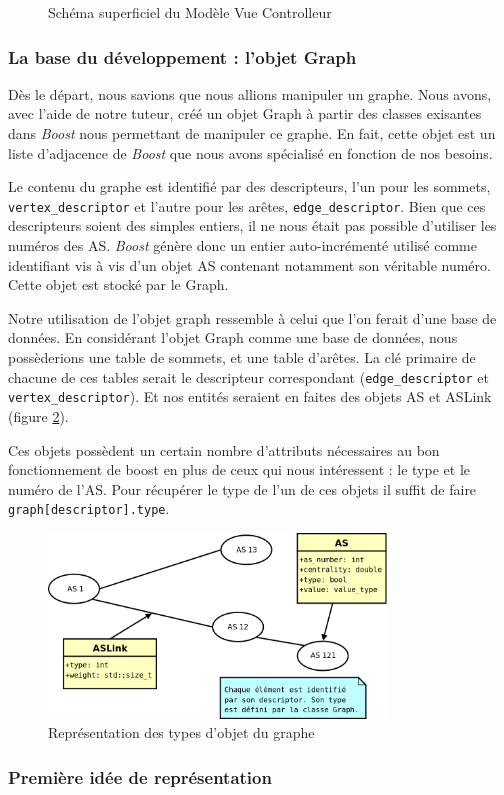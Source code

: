 \begin{figure}[!ht]
\begin{center}
\caption{Schéma superficiel du Modèle Vue Controlleur}
\label{mvc}
\end{center}
\end{figure}

\subsubsection{La base du développement : l'objet Graph}

Dès le départ, nous savions que nous allions manipuler un graphe. Nous avons, avec l'aide de notre tuteur, créé un objet Graph à partir des classes exisantes dans \textit{Boost} nous permettant de manipuler ce graphe. En fait, cette objet est un liste d'adjacence de \textit{Boost} que nous avons spécialisé en fonction de nos besoins.

Le contenu du graphe est identifié par des descripteurs, l'un pour les sommets, \verb|vertex_descriptor| et l'autre pour les arêtes, \verb|edge_descriptor|. Bien que ces descripteurs soient des simples entiers, il ne nous était pas possible d'utiliser les numéros des AS. \textit{Boost} génère donc un entier auto-incrémenté utilisé comme identifiant vis à vis d'un objet AS contenant notamment son véritable numéro. Cette objet est stocké par le Graph.

Notre utilisation de l'objet graph ressemble à celui que l'on ferait d'une base de données. En considérant l'objet Graph comme une base de données, nous possèderions une table de sommets, et une table d'arêtes. La clé primaire de chacune de ces tables serait le descripteur correspondant (\verb|edge_descriptor| et \verb|vertex_descriptor|). Et nos entités seraient en faites des objets AS et ASLink (figure \ref{bdd}).

Ces objets possèdent un certain nombre d'attributs nécessaires au bon fonctionnement de boost en plus de ceux qui nous intéressent : le type et le numéro de l'AS. Pour récupérer le type de l'un de ces objets il suffit de faire \verb|graph[descriptor].type|.


\begin{figure}[!ht]
\begin{center}
        \includegraphics[width=0.8\textwidth]{./schema/bdd.png}
\caption{Représentation des types d'objet du graphe}
\label{bdd}
\end{center}
\end{figure}

\subsubsection{Première idée de représentation}
